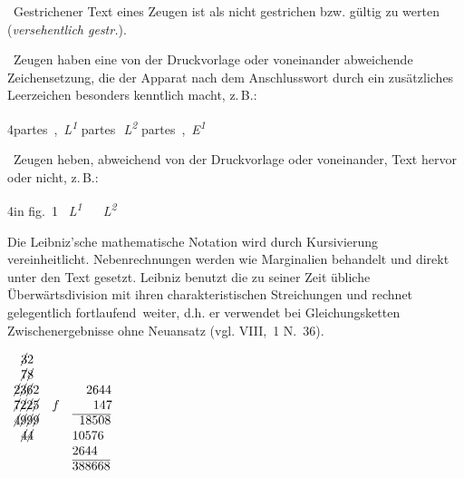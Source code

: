 \noindent\textemdash\ Gestrichener Text eines Zeugen ist als nicht gestrichen bzw. gültig zu werten (\textit{versehentlich gestr.}).
\par

\noindent\textemdash\ Zeugen haben eine von der Druckvorlage oder voneinander abweichende Zeichensetzung, die der Apparat nach dem Anschlusswort durch ein zusätzliches Leerzeichen besonders kenntlich macht, z.\,B.:
\par %
{\footnotesize%
4\hspace{5mm}partes~,~\textit{L\textsuperscript{1}}\enskip
\textbullet\enskip partes\,~\textit{L\textsuperscript{2}}\enskip
\textbullet\enskip partes~,~\textit{E\textsuperscript{1}}
}%
\par
\medskip

\noindent\textemdash\ Zeugen heben, abweichend von der Druckvorlage oder voneinander, Text hervor oder nicht, z.\,B.:
\par %
{\footnotesize%
4\hspace{5mm}in \hspace{0,5mm} fig.~1%
~\textit{L\textsuperscript{1}}\enskip
\textbullet\enskip {} ~%
~\textit{L\textsuperscript{2}}}



\noindent Die Leibniz'sche mathematische Notation wird durch Kursivierung vereinheitlicht. Nebenrechnungen werden wie Marginalien behandelt und direkt unter den Text gesetzt. Leibniz benutzt die zu seiner Zeit übliche Überwärtsdivision mit ihren charakteristischen Streichungen und rechnet gelegentlich \glqq fortlaufend\grqq\ weiter, d.h. er verwendet bei Gleichungsketten Zwischenergebnisse ohne Neuansatz (vgl. VIII,~1 N.~36).
\vspace{2ex}

{\centering
$\begin{array}{lllr}             
\hspace{5.5pt}\cancel{3}2&&&\\
\hspace{5.5pt}\cancel{7}\cancel{8}&&&\\
\cancel{2}\cancel{3}\cancel{6}2&&\hspace{11pt}2644&\\
\cancel{7}\cancel{2}\cancel{2}\cancel{5}& f &\hspace{16.5pt}147&\\
\cancel{4}\cancel{9}\cancel{9}\cancel{9}& &\overline{\hspace{5.5pt}18508}&\\
\hspace{5.5pt}\cancel{4}\cancel{4}&&10576&\\
  &&2644&\\
  &&\overline{388668}&
 \end{array}$
\par}
\par
\vspace{2ex}

